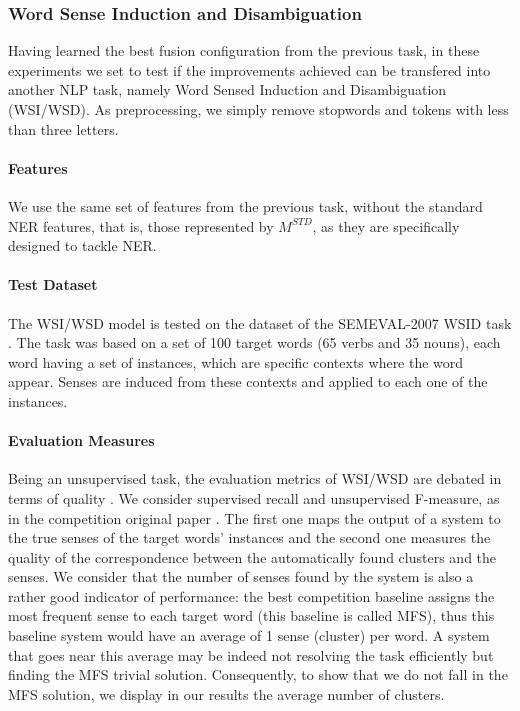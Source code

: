 \subsubsection{Word Sense Induction and Disambiguation}
Having learned the best fusion configuration from the previous task, in these experiments we set to test if the improvements achieved can be transfered into another NLP task, namely Word Sensed Induction and Disambiguation (WSI/WSD). As preprocessing, we simply remove stopwords and tokens with less than three letters.

\paragraph{Features}
We use the same set of features from the previous task, without the standard NER features, that is, those represented by $M^{STD}$, as they are specifically designed to tackle NER.
\paragraph{Test Dataset}
The WSI/WSD model is tested on the dataset of  the SEMEVAL-2007 WSID task \cite{Agirre2007}. The task was based on a set of 100 target words (65 verbs and 35 nouns), each  word having a set of instances, which are specific contexts where the word appear. Senses are induced from these contexts and applied to each one of the instances.


\paragraph{Evaluation Measures}
Being an unsupervised task, the evaluation metrics of WSI/WSD are debated in terms of quality \cite{CruysA11}. We consider supervised recall and unsupervised F-measure, as in the competition original paper \cite{Agirre2007}. The first one maps the output of a system to the true senses of the target words' instances and the second one measures the quality of the correspondence between the automatically found clusters and the senses. 
We consider that the number of senses found by the system is also a rather good indicator of performance: the best competition baseline assigns the most frequent sense to each target word (this baseline is called MFS), thus this baseline system would have an average of 1 sense (cluster) per word. A system that goes near this average may be indeed not resolving the task efficiently but finding the MFS trivial solution. Consequently, to show that we do not fall in the MFS solution, we display in our results the average number of clusters.

